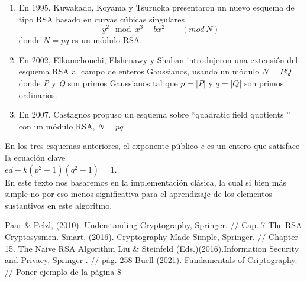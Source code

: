 \documentclass[10pt,letterpaper]{article}
\begin{document}
	\begin{enumerate}
		\item En 1995, Kuwakado, Koyama y Tsuruoka presentaron un nuevo esquema de tipo RSA basado en curvas cúbicas singulares 
		\begin{equation*}
			y^2 \mod x^3 + bx^2 \qquad (mod \, N)
		\end{equation*}
		\noindent donde $N = pq$ es un módulo RSA. 
		\item  En 2002, Elkamchouchi, Elshenawy y Shaban introdujeron una extensión del esquema RSA al campo de enteros Gaussianos, usando un módulo $N = PQ$
		donde \textit{P} y \textit{Q} son primos Gaussianos tal que $p = |P|$ y $q = |Q|$
		son primos ordinarios. 
		\item En 2007, Castagnos propuso un esquema sobre ``quadratic field quotients '' con un módulo RSA, $ N = pq$
	\end{enumerate} 
 En los tres esquemas anteriores, el exponente público \textit{e} es un entero que satisface la ecuación clave \\ $ed - k(p^2 - 1)(q^2- 1) =1$. \\
 En este texto nos basaremos en la implementación clásica, la cual si bien más simple no por eso menos significativa para el aprendizaje de los elementos sustantivos en este algoritmo.
	


\begin{thebibliography}{100}
	 Paar \& Pelzl, (2010). Understanding Cryptography, Springer. // Cap. 7 The RSA Cryptosysmen.
	 Smart, (2016). Cryptography Made Simple, Springer. // Chapter 15. The Naive RSA Algorithm
	 Liu \& Steinfeld (Eds.)(2016).Information Security and Privacy, Springer . // pág. 258 
	 Buell (2021). Fundamentals of Criptography. // Poner ejemplo de la página 8 
\end{thebibliography}
\end{document}
